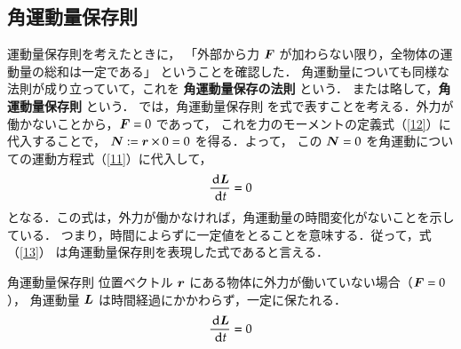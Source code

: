         \subsection{角運動量保存則}
                運動量保存則を考えたときに，
                「外部から力 $\boldsymbol{F}$ が加わらない限り，全物体の運動量の総和は一定である」
                ということを確認した．
                角運動量についても同様な法則が成り立っていて，これを \textbf{角運動量保存の法則} という．
                または略して，\textbf{角運動量保存則} という．
                では，角運動量保存則 を式で表すことを考える．外力が働かないことから，$\boldsymbol{F}=0$ であって，
                これを力のモーメントの定義式（\ref{12}）に代入することで，
                $\boldsymbol{N} := \boldsymbol{r} \times 0 =0$ を得る．よって，
                この $\boldsymbol{N}=0$ を角運動についての運動方程式（\ref{11}）に代入して，
                \begin{equation*}
                    \frac{\,\mathrm{d}\boldsymbol{L}}{\,\mathrm{d} t} = 0
                \end{equation*}
                となる．この式は，外力が働かなければ，角運動量の時間変化がないことを示している．
                つまり，時間によらずに一定値をとることを意味する．従って，式（\ref{13}）
                は角運動量保存則を表現した式であると言える．
                    \begin{myshadebox}{角運動量保存則}
                            位置ベクトル $\boldsymbol{r}$ にある物体に外力が働いていない場合（$\boldsymbol{F}=0$），
                            角運動量 $\boldsymbol{L}$ は時間経過にかかわらず，一定に保たれる．
                            \begin{align}\label{13}
                                \frac{\df\bL}{\df t} = 0
                            \end{align}
                    \end{myshadebox}

